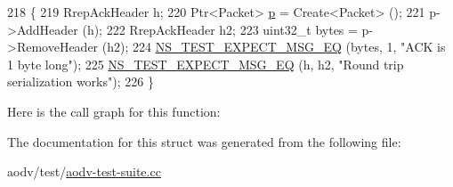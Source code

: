 \begin{DoxyCode}
218   \{
219     RrepAckHeader h;
220     Ptr<Packet> \hyperlink{lte__link__budget_8m_ac9de518908a968428863f829398a4e62}{p} = Create<Packet> ();
221     p->AddHeader (h);
222     RrepAckHeader h2;
223     uint32\_t bytes = p->RemoveHeader (h2);
224     \hyperlink{group__testing_ga7304ba46a28d8cf08dfdfd6499cf7068}{NS\_TEST\_EXPECT\_MSG\_EQ} (bytes, 1, \textcolor{stringliteral}{"ACK is 1 byte long"});
225     \hyperlink{group__testing_ga7304ba46a28d8cf08dfdfd6499cf7068}{NS\_TEST\_EXPECT\_MSG\_EQ} (h, h2, \textcolor{stringliteral}{"Round trip serialization works"});
226   \}
\end{DoxyCode}


Here is the call graph for this function\+:




The documentation for this struct was generated from the following file\+:\begin{DoxyCompactItemize}
\item 
aodv/test/\hyperlink{aodv-test-suite_8cc}{aodv-\/test-\/suite.\+cc}\end{DoxyCompactItemize}
